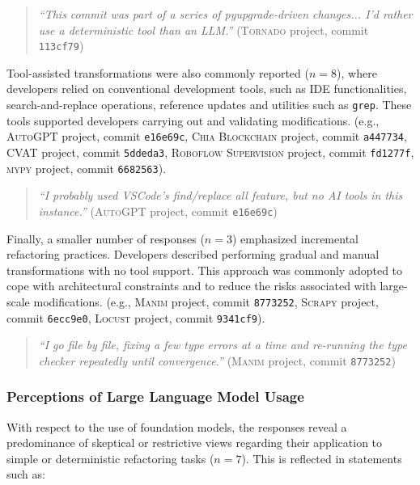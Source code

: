 \begin{quote}
\textit{``This commit was part of a series of pyupgrade-driven changes... I’d rather use a deterministic tool than an LLM.''} (\textsc{Tornado} project, commit \texttt{113cf79})
\end{quote}

Tool-assisted transformations were also commonly reported ($n = 8$), where developers relied on conventional development tools, such as IDE functionalities, search-and-replace operations, reference updates and utilities such as \texttt{grep}. These tools supported developers carrying out and validating modifications. (e.g., \textsc{AutoGPT} project, commit \texttt{e16e69c}, \textsc{Chia Blockchain} project, commit \texttt{a447734}, \textsc{CVAT} project, commit \texttt{5ddeda3}, \textsc{Roboflow Supervision} project, commit \texttt{fd1277f}, \textsc{mypy} project, commit \texttt{6682563}).

\begin{quote}
\textit{``I probably used VSCode’s find/replace all feature, but no AI tools in this instance.''} (\textsc{AutoGPT} project, commit \texttt{e16e69c})
\end{quote}

Finally, a smaller number of responses ($n = 3$) emphasized incremental refactoring practices. Developers described performing gradual and manual transformations with no tool support. This approach was commonly adopted to cope with architectural constraints and to reduce the risks associated with large-scale modifications. (e.g., \textsc{Manim} project, commit \texttt{8773252}, \textsc{Scrapy} project, commit \texttt{6ecc9e0}, \textsc{Locust} project, commit \texttt{9341cf9}).

\begin{quote}
\textit{``I go file by file, fixing a few type errors at a time and re-running the type checker repeatedly until convergence.''} (\textsc{Manim} project, commit \texttt{8773252})
\end{quote}
\subsubsection{Perceptions of Large Language Model Usage}

With respect to the use of foundation models, the responses reveal a predominance of skeptical or restrictive views regarding their application to simple or deterministic refactoring tasks ($n = 7$). This is reflected in statements such as:

